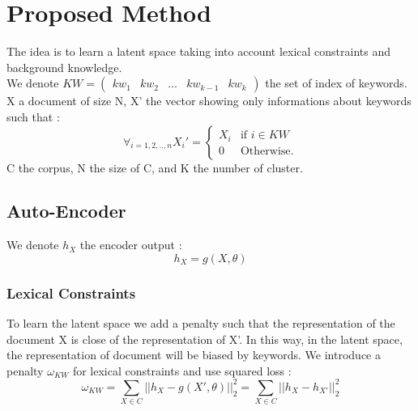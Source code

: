 \section{Proposed Method}
The idea is to learn a latent space taking into account lexical constraints and
background knowledge.
\\We denote $KW = \begin{pmatrix} kw_1 & kw_2 & ... & kw_{k-1} & kw_{k}
\end {pmatrix}$
the set of index of keywords. X a document of size N,
X' the vector showing only informations about keywords such that :
\begin{equation*}
\forall_{i=1,2,..,n}X_i' = \left\{
\begin{array}{ll}
  X_i & \mbox{if } i \in KW \\
  0 & \mbox{Otherwise.}
\end{array}
\right.
\end{equation*}
C the corpus, N the size of C, and K the number of cluster.
\subsection{Auto-Encoder}
We denote $h_X$ the encoder output : 
\begin{equation}\label{eq:h}
  h_X = g(X,\theta)
\end{equation}
\subsubsection{Lexical Constraints}
To learn the latent space we add a penalty such that the representation
of the document X is close of the representation of X'. In this way, in the
latent space, the representation of document will be biased by keywords.
We introduce a penalty $\omega_{KW}$ for lexical constraints and
use squared loss : 
\begin{equation}\label{eq:omega1}
  \omega_{KW} = \sum_{X \in C} || h_{X} - g(X',\theta) ||_2^2 =
  \sum_{X \in C} || h_{X} - h_{X'}||_2^2
\end{equation}

